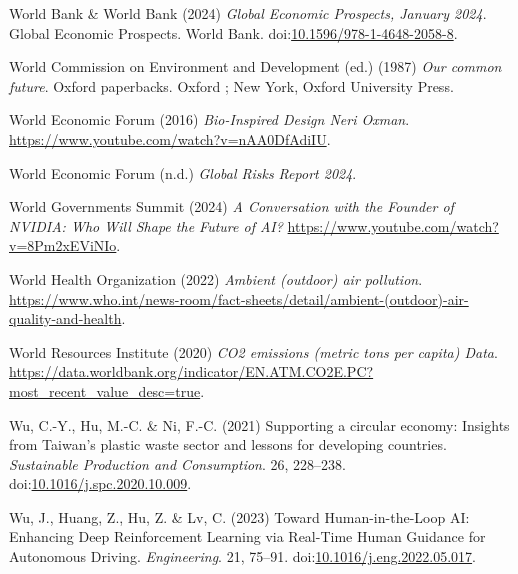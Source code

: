 \documentclass[
  letterpaper,
  DIV=11,
  numbers=noendperiod]{scrartcl}
\newlength{\cslhangindent}
\newenvironment{CSLReferences}[2] %
 {\begin{list}{}{%
  \setlength{\itemindent}{0pt}
  \setlength{\leftmargin}{0pt}
  \setlength{\parsep}{0pt}
  \ifodd #1
   \setlength{\leftmargin}{\cslhangindent}
   \setlength{\itemindent}{-1\cslhangindent}
  \fi
  \setlength{\itemsep}{#2\baselineskip}}}
 {\end{list}}
\begin{document}
\begin{CSLReferences}{0}{1}
World Bank \& World Bank (2024) \emph{Global {Economic Prospects},
{January} 2024}. Global {Economic Prospects}. World Bank.
doi:\href{https://doi.org/10.1596/978-1-4648-2058-8}{10.1596/978-1-4648-2058-8}.

World Commission on Environment and Development (ed.) (1987) \emph{Our
common future}. Oxford paperbacks. Oxford ; New York, Oxford University
Press.

World Economic Forum (2016) \emph{Bio-{Inspired Design} {\textbar} {Neri
Oxman}}. \url{https://www.youtube.com/watch?v=nAA0DfAdiIU}.

World Economic Forum (n.d.) \emph{Global {Risks Report} 2024}.

World Governments Summit (2024) \emph{A {Conversation} with the
{Founder} of {NVIDIA}: {Who Will Shape} the {Future} of {AI}?}
\url{https://www.youtube.com/watch?v=8Pm2xEViNIo}.

World Health Organization (2022) \emph{Ambient (outdoor) air pollution}.
\url{https://www.who.int/news-room/fact-sheets/detail/ambient-(outdoor)-air-quality-and-health}.

World Resources Institute (2020) \emph{{CO2} emissions (metric tons per
capita) {\textbar} {Data}}.
\url{https://data.worldbank.org/indicator/EN.ATM.CO2E.PC?most_recent_value_desc=true}.

Wu, C.-Y., Hu, M.-C. \& Ni, F.-C. (2021) Supporting a circular economy:
{Insights} from {Taiwan}'s plastic waste sector and lessons for
developing countries. \emph{Sustainable Production and Consumption}. 26,
228--238.
doi:\href{https://doi.org/10.1016/j.spc.2020.10.009}{10.1016/j.spc.2020.10.009}.

Wu, J., Huang, Z., Hu, Z. \& Lv, C. (2023) Toward {Human-in-the-Loop
AI}: {Enhancing Deep Reinforcement Learning} via {Real-Time Human
Guidance} for {Autonomous Driving}. \emph{Engineering}. 21, 75--91.
doi:\href{https://doi.org/10.1016/j.eng.2022.05.017}{10.1016/j.eng.2022.05.017}.


\end{CSLReferences}
\end{document}
